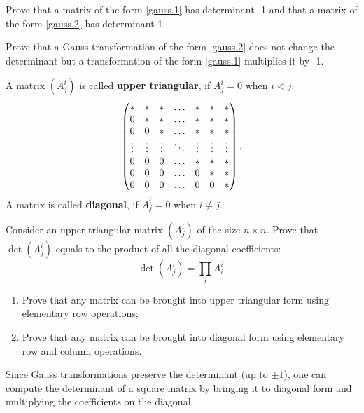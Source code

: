 \documentclass[12pt]{article}
\begin{document}
\begin{zadacha}
Prove that a matrix of the form  \eqref{gauss.1} has determinant -1
and that a matrix of the form \eqref{gauss.2} has determinant 1.
\end{zadacha}

\begin{zadacha}[!]
Prove that a Gauss transformation of the form \eqref{gauss.2}
does not change the determinant but a transformation of the form
\eqref{gauss.1} multiplies it by -1.
\end{zadacha}

\begin{opredelenie}
A matrix $(A^i_j)$ is called {\bf upper triangular},
if $A^i_j=0$ when $i<j$:
$$
\begin{pmatrix}
*&*&* &\hdotsfor{1} &*&*&*\\
0&*&* &\hdotsfor{1} &*&*&*\\
0&0&* &\hdotsfor{1} &*&*&*\\
\vdots&\vdots&\vdots&
\ddots
&\vdots&\vdots&\vdots\\
0&0&0 &\hdotsfor{1} &*&*&*\\
0&0&0 &\hdotsfor{1} &0&*&*\\
0&0&0 &\hdotsfor{1} &0&0&*
\end{pmatrix}.
$$
A matrix is called 
{\bf diagonal}, if $A^i_j=0$ when $i \neq j$.
\end{opredelenie}

\begin{zadacha}[!]
  Consider an upper triangular matrix $(A^i_j)$ of the size $n \times
  n$.  Prove that $\det (A^i_j)$ equals to the product of all the
  diagonal coefficients:
\[ \det (A^i_j) = \prod_i A^i_i.
\]
\end{zadacha}

\begin{zadacha}\label{gss}
\begin{enumerate}
\item Prove that any matrix can be brought into upper triangular form
  using elementary row operations; 
\item Prove that any matrix can be brought into diagonal form
  using elementary row and column operations.
\end{enumerate}
\end{zadacha}

\begin{zamechanie}
Since Gauss transformations preserve the determinant (up to $\pm 1$),
one can compute the determinant of a square matrix by bringing it to
diagonal form and multiplying the coefficients on the diagonal.
\end{zamechanie}
\end{document}
